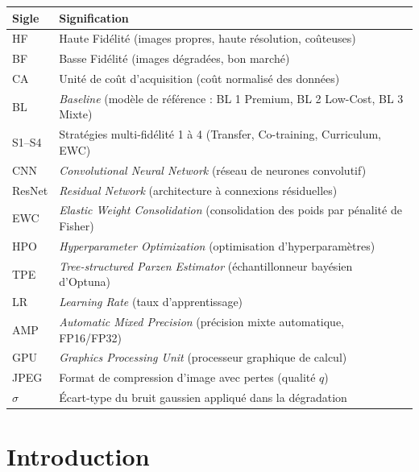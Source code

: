 \documentclass[11pt,a4paper,openany]{book}
\newcommand{\tableheadcolor}{\rowcolor{headerbg}}
\newcommand{\tablerowodd}{}
\begin{document}
\renewcommand{\arraystretch}{1.35}
\begin{tabularx}{\linewidth}{L{2.6cm} X}
  \toprule
  \tableheadcolor
  \textbf{Sigle} & \textbf{Signification} \\
  \midrule
  \tablerowodd
  HF & Haute Fidélité (images propres, haute résolution, coûteuses) \\
  BF & Basse Fidélité (images dégradées, bon marché) \\
  \tablerowodd
  CA & Unité de coût d'acquisition (coût normalisé des données) \\
  BL & \textit{Baseline} (modèle de référence : BL 1 Premium, BL 2 Low-Cost, BL 3 Mixte) \\
  \tablerowodd
  S1--S4 & Stratégies multi-fidélité 1 à 4 (Transfer, Co-training, Curriculum, EWC) \\
  CNN & \textit{Convolutional Neural Network} (réseau de neurones convolutif) \\
  \tablerowodd
  ResNet & \textit{Residual Network} (architecture à connexions résiduelles) \\
  EWC & \textit{Elastic Weight Consolidation} (consolidation des poids par pénalité de Fisher) \\
  \tablerowodd
  HPO & \textit{Hyperparameter Optimization} (optimisation d'hyperparamètres) \\
  TPE & \textit{Tree-structured Parzen Estimator} (échantillonneur bayésien d'Optuna) \\
  \tablerowodd
  LR & \textit{Learning Rate} (taux d'apprentissage) \\
  AMP & \textit{Automatic Mixed Precision} (précision mixte automatique, FP16/FP32) \\
  \tablerowodd
  GPU & \textit{Graphics Processing Unit} (processeur graphique de calcul) \\
  JPEG & Format de compression d'image avec pertes (qualité $q$) \\
  \tablerowodd
  $\sigma$ & Écart-type du bruit gaussien appliqué dans la dégradation \\
  \bottomrule
\end{tabularx}

\newpage

\chapter{Introduction}
\end{document}
